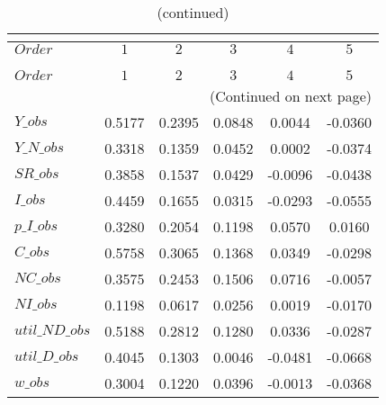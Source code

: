  
\begin{center}
\begin{longtable}{lccccc} 
\caption{COEFFICIENTS OF AUTOCORRELATION}\\
 \label{Table:th_autocorr_matrix}\\
\toprule 
$Order          $	 & 	 $         1$	 & 	 $         2$	 & 	 $         3$	 & 	 $         4$	 & 	 $         5$\\
\midrule \endfirsthead 
\caption{(continued)}\\
 \toprule \\ 
$Order          $	 & 	 $         1$	 & 	 $         2$	 & 	 $         3$	 & 	 $         4$	 & 	 $         5$\\
\midrule \endhead 
\midrule \multicolumn{6}{r}{(Continued on next page)} \\ \bottomrule \endfoot 
\bottomrule \endlastfoot 
$Y\_obs         $	 & 	    0.5177	 & 	    0.2395	 & 	    0.0848	 & 	    0.0044	 & 	   -0.0360 \\ 
$Y\_N\_obs      $	 & 	    0.3318	 & 	    0.1359	 & 	    0.0452	 & 	    0.0002	 & 	   -0.0374 \\ 
$SR\_obs        $	 & 	    0.3858	 & 	    0.1537	 & 	    0.0429	 & 	   -0.0096	 & 	   -0.0438 \\ 
$I\_obs         $	 & 	    0.4459	 & 	    0.1655	 & 	    0.0315	 & 	   -0.0293	 & 	   -0.0555 \\ 
$p\_I\_obs      $	 & 	    0.3280	 & 	    0.2054	 & 	    0.1198	 & 	    0.0570	 & 	    0.0160 \\ 
$C\_obs         $	 & 	    0.5758	 & 	    0.3065	 & 	    0.1368	 & 	    0.0349	 & 	   -0.0298 \\ 
$NC\_obs        $	 & 	    0.3575	 & 	    0.2453	 & 	    0.1506	 & 	    0.0716	 & 	   -0.0057 \\ 
$NI\_obs        $	 & 	    0.1198	 & 	    0.0617	 & 	    0.0256	 & 	    0.0019	 & 	   -0.0170 \\ 
$util\_ND\_obs  $	 & 	    0.5188	 & 	    0.2812	 & 	    0.1280	 & 	    0.0336	 & 	   -0.0287 \\ 
$util\_D\_obs   $	 & 	    0.4045	 & 	    0.1303	 & 	    0.0046	 & 	   -0.0481	 & 	   -0.0668 \\ 
$w\_obs         $	 & 	    0.3004	 & 	    0.1220	 & 	    0.0396	 & 	   -0.0013	 & 	   -0.0368 \\ 
\end{longtable}
 \end{center}

